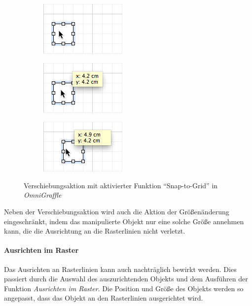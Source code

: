 \begin{figure}[hbt]
    \newcommand{\subfigurewidth}{0.33\textwidth}
    \newcommand{\graphicswidth}{0.95\linewidth}
    \begin{subfigure}{\subfigurewidth}
        \centering
        \includegraphics[width=\graphicswidth]{assets/omnigraffle-snap-to-grid-on-a}
        \caption{}
    \end{subfigure}
    \begin{subfigure}{\subfigurewidth}
        \centering
        \includegraphics[width=\graphicswidth]{assets/omnigraffle-snap-to-grid-on-b}
        \caption{}
    \end{subfigure}
    \begin{subfigure}{\subfigurewidth}
        \centering
        \includegraphics[width=\graphicswidth]{assets/omnigraffle-snap-to-grid-on-c}
        \caption{}
    \end{subfigure}
    \caption{Verschiebungsaktion mit aktivierter Funktion \enquote{Snap-to-Grid} in \textit{OmniGraffle}}
    \label{fig:omnigraffle-snap-to-grid-on}
\end{figure}

Neben der Verschiebungsaktion wird auch die Aktion der Größenänderung eingeschränkt, indem das manipulierte Objekt nur eine solche Größe annehmen kann, die die Ausrichtung an die Rasterlinien nicht verletzt.

\paragraph{Ausrichten im Raster}

Das Ausrichten an Rasterlinien kann auch nachträglich bewirkt werden. Dies passiert durch die Auswahl des auszurichtenden Objekts und dem Ausführen der Funktion \textit{Ausrichten im Raster}. Die Position und Größe des Objekts werden so angepasst, dass das Objekt an den Rasterlinien ausgerichtet wird.

